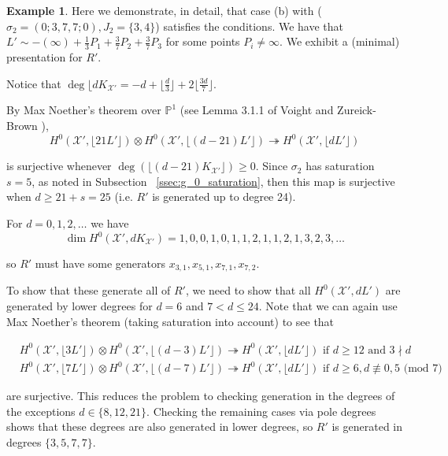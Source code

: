 \documentclass{amsart}
\theoremstyle{plain}
\theoremstyle{definition}
\newtheorem{example}[thm]{Example}
\theoremstyle{remark}
\numberwithin{equation}{section}
\newcommand\BP{{\mathbb P}}
\newcommand \sx{\mathscr X}
\newcommand \halfcan{L}
\begin{document}
\begin{example}
\label{ex:base-377}
Here we demonstrate, in detail, that case (b) with ($\sigma_2 =
(0; 3, 7, 7; 0), J_2 = \{3, 4\}$) satisfies the conditions.
We have that $\halfcan' \sim -(\infty) + \frac{1}{3} P_1 +
\frac{3}{7} P_2 + \frac{3}{7} P_3$ for some points $P_i \neq \infty$.
We exhibit a (minimal) presentation for $R'$.

Notice that $\deg \lfloor d K_{\sx'} = -d + \lfloor \frac{d}{3}
\rfloor + 2 \lfloor \frac{3d}{7} \rfloor$.

By Max Noether's theorem over $\BP^1$ (see Lemma 3.1.1 of Voight
and Zureick-Brown \cite{vzb:stacky}),
\[
	H^0 (\sx', \lfloor 21 \halfcan' \rfloor) \otimes H^0 (\sx', \lfloor
	(d - 21) \halfcan' \rfloor) \twoheadrightarrow H^0 (\sx', \lfloor
	d \halfcan' \rfloor)
\]

\noindent
is surjective whenever $\deg (\lfloor (d - 21) K_{\sx'} \rfloor)
\geq 0$. Since $\sigma_2$ has saturation $s = 5$, as noted in
Subsection ~\ref{ssec:g_0_saturation}, then this map is surjective
when $d \geq 21 + s = 25$ (i.e. $R'$ is generated up to degree 24).

For $d = 0, 1, 2, \ldots$ we have
\[
	\dim H^0 (\sx', d K_{\sx'}) = 1, 0, 0, 1, 0, 1, 1, 2, 1, 1, 2, 1, 3, 2, 3, \ldots
\]

\noindent
so $R'$ must have some generators $x_{3, 1}, x_{5, 1}, x_{7, 1},
x_{7, 2}$.

To show that these generate all of $R'$, we need to show that all
$H^0 (\sx', d \halfcan')$ are generated by lower degrees for $d = 6$
and $7 < d \leq 24$. Note that we can again use Max Noether's theorem
(taking saturation into account) to see that

\begin{align*}
	&H^0 (\sx', \lfloor 3 \halfcan' \rfloor) \otimes H^0 (\sx', \lfloor
	(d - 3) \halfcan' \rfloor) \twoheadrightarrow H^0 (\sx', \lfloor
	d \halfcan' \rfloor) \text{ if } d \geq 12 \text{ and } 3 \nmid d \\
	&H^0 (\sx', \lfloor 7 \halfcan' \rfloor) \otimes H^0 (\sx', \lfloor
	(d - 7) \halfcan' \rfloor) \twoheadrightarrow H^0 (\sx', \lfloor
	d \halfcan' \rfloor) \text{ if } d \geq 6, d \not\equiv 0, 5
	\text{ (mod } 7)
\end{align*}

\noindent
are surjective. This reduces the problem to checking generation
in the degrees of the exceptions $d \in \{8, 12, 21\}$.
Checking the remaining cases via pole degrees shows that
these degrees are also generated in lower degrees,
so $R'$ is generated in degrees $\{3, 5, 7, 7\}$.


\end{example}
\end{document}
